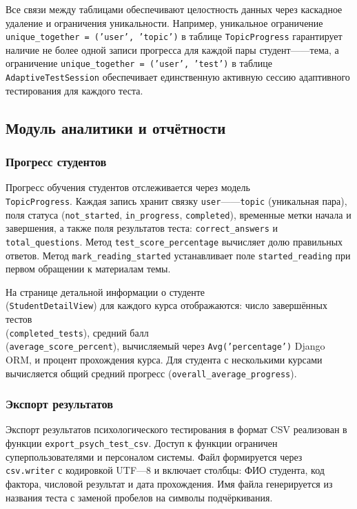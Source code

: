 Все связи между таблицами обеспечивают целостность данных через каскадное удаление и ограничения уникальности. Например, уникальное ограничение \texttt{unique\_together = ('user', 'topic')} в таблице \texttt{TopicProgress} гарантирует наличие не более одной записи прогресса для каждой пары студент------тема, а ограничение \texttt{unique\_together = ('user', 'test')} в таблице \texttt{AdaptiveTestSession} обеспечивает единственную активную сессию адаптивного тестирования для каждого теста.
\subsection{Модуль аналитики и отчётности}
\label{subsec:analytics_module}

\subsubsection{Прогресс студентов}

Прогресс обучения студентов отслеживается через модель\\ 
\texttt{TopicProgress}. Каждая запись хранит связку 
\texttt{user}------\texttt{topic} (уникальная пара), поля статуса 
(\texttt{not\_started}, \texttt{in\_progress}, \texttt{completed}), 
временные метки начала и завершения, а также поля результатов теста: 
\texttt{correct\_answers} и \texttt{total\_questions}. Метод 
\texttt{test\_score\_percentage} вычисляет долю правильных ответов. 
Метод \texttt{mark\_reading\_started} устанавливает поле 
\texttt{started\_reading} при первом обращении к материалам темы.

На странице детальной информации о студенте\\ 
(\texttt{StudentDetailView}) для каждого курса отображаются: 
число завершённых тестов\\ (\texttt{completed\_tests}), средний балл\\ 
(\texttt{average\_score\_percent}), вычисляемый через 
\texttt{Avg('percentage')} Django ORM, и процент прохождения курса. 
Для студента с несколькими курсами вычисляется общий средний 
прогресс (\texttt{overall\_average\_progress}).

\subsubsection{Экспорт результатов}

Экспорт результатов психологического тестирования в формат CSV 
реализован в функции \texttt{export\_psych\_test\_csv}. Доступ к 
функции ограничен суперпользователями и персоналом системы. 
Файл формируется через \texttt{csv.writer} с кодировкой UTF---8 
и включает столбцы: ФИО студента, код фактора, числовой результат 
и дата прохождения. Имя файла генерируется из названия теста с 
заменой пробелов на символы подчёркивания.

